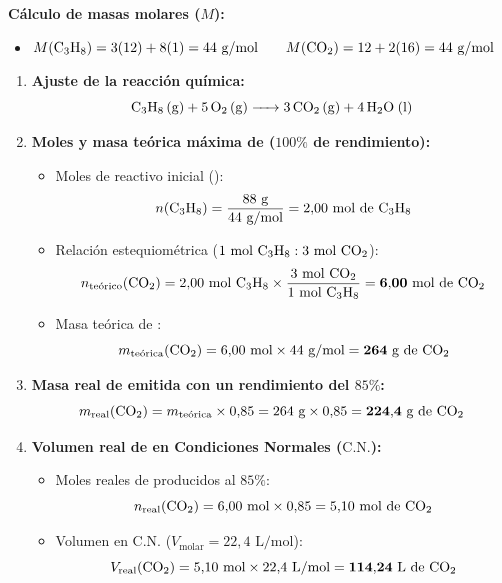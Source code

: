 ﻿\documentclass[11pt,a4paper]{article}
\begin{document}
\vspace{0.3cm}
\noindent\textbf{Cálculo de masas molares ($M$):}
\begin{itemize}[leftmargin=1.5em, itemsep=2pt]
    \item $M(\ce{C3H8}) = 3(12) + 8(1) = 44\text{ g/mol} \qquad M(\ce{CO2}) = 12 + 2(16) = 44\text{ g/mol}$
\end{itemize}

\vspace{0.2cm}
\begin{enumerate}[label=\textbf{\alph*)}, leftmargin=2em, itemsep=8pt]
    \item \textbf{Ajuste de la reacción química:}
    \[
    \ce{C3H8 (g) + 5 O2 (g) -> 3 CO2 (g) + 4 H2O (l)}
    \]

    \item \textbf{Moles y masa teórica máxima de  ($100\%$ de rendimiento):}
    \begin{itemize}[leftmargin=1.5em, itemsep=2pt]
        \item Moles de reactivo inicial ():
        \[
        n(\ce{C3H8}) = \frac{88\text{ g}}{44\text{ g/mol}} = 2{,}00\text{ mol de \ce{C3H8}}
        \]
        \item Relación estequiométrica ($1\text{ mol \ce{C3H8}} : 3\text{ mol \ce{CO2}}$):
        \[
        n_{\text{teórico}}(\ce{CO2}) = 2{,}00\text{ mol \ce{C3H8}} \times \frac{3\text{ mol \ce{CO2}}}{1\text{ mol \ce{C3H8}}} = \mathbf{6{,}00\text{ mol de \ce{CO2}}}
        \]
        \item Masa teórica de :
        \[
        m_{\text{teórica}}(\ce{CO2}) = 6{,}00\text{ mol} \times 44\text{ g/mol} = \mathbf{264\text{ g de \ce{CO2}}}
        \]
    \end{itemize}

    \item \textbf{Masa real de  emitida con un rendimiento del $85\%$:}
    \[
    m_{\text{real}}(\ce{CO2}) = m_{\text{teórica}} \times 0{,}85 = 264\text{ g} \times 0{,}85 = \mathbf{224{,}4\text{ g de \ce{CO2}}}
    \]

    \item \textbf{Volumen real de  en Condiciones Normales ($\text{C.N.}$):}
    \begin{itemize}[leftmargin=1.5em, itemsep=2pt]
        \item Moles reales de  producidos al $85\%$:
        \[
        n_{\text{real}}(\ce{CO2}) = 6{,}00\text{ mol} \times 0{,}85 = 5{,}10\text{ mol de \ce{CO2}}
        \]
        \item Volumen en C.N. ($V_{\text{molar}} = 22{,}4\text{ L/mol}$):
        \[
        V_{\text{real}}(\ce{CO2}) = 5{,}10\text{ mol} \times 22{,}4\text{ L/mol} = \mathbf{114{,}24\text{ L de \ce{CO2}}}
        \]
    \end{itemize}
\end{enumerate}
\end{document}
